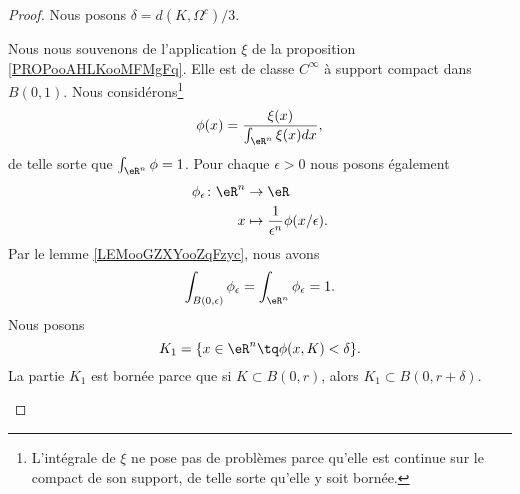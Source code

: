 \begin{proof}
	Nous posons \( \delta=d(K,\Omega^c)/3\).
	\begin{subproof}
		Nous nous souvenons de l'application \( \xi\) de la proposition \ref{PROPooAHLKooMFMgFq}. Elle est de classe \( C^{\infty}\) à support compact dans \( B(0,1)\). Nous considérons\footnote{L'intégrale de \( \xi\) ne pose pas de problèmes parce qu'elle est continue sur le compact de son support, de telle sorte qu'elle y soit bornée.}
		\begin{equation}
			\phi(x)=\frac{ \xi(x) }{ \int_{\eR^n}\xi(x)dx },
		\end{equation}
		de telle sorte que \( \int_{\eR^n}\phi=1\). Pour chaque \( \epsilon>0\) nous posons également
		\begin{equation}
			\begin{aligned}
				\phi_{\epsilon}\colon \eR^n & \to \eR                                        \\
				x                           & \mapsto \frac{1}{ \epsilon^n}\phi(x/\epsilon).
			\end{aligned}
		\end{equation}
		Par le lemme \ref{LEMooGZXYooZqFzyc}, nous avons
		\begin{equation}		\label{EQooDUOCooLKPmOZ}
			\int_{B(0,\epsilon)}\phi_{\epsilon}  =\int_{\eR^n}\phi_{\epsilon} =1.
		\end{equation}
		\spitem[La partie \( K_1\)]
		Nous posons
		\begin{equation}		\label{EQooLXRMooKxKHSF}
			K_1=\{ x\in \eR^n\tq \phi(x,K)<\delta \}.
		\end{equation}
		La partie \( K_1\) est bornée parce que si \( K\subset B(0,r)\), alors \( K_1\subset B(0,r+\delta)\).


\end{subproof}
\end{proof}

